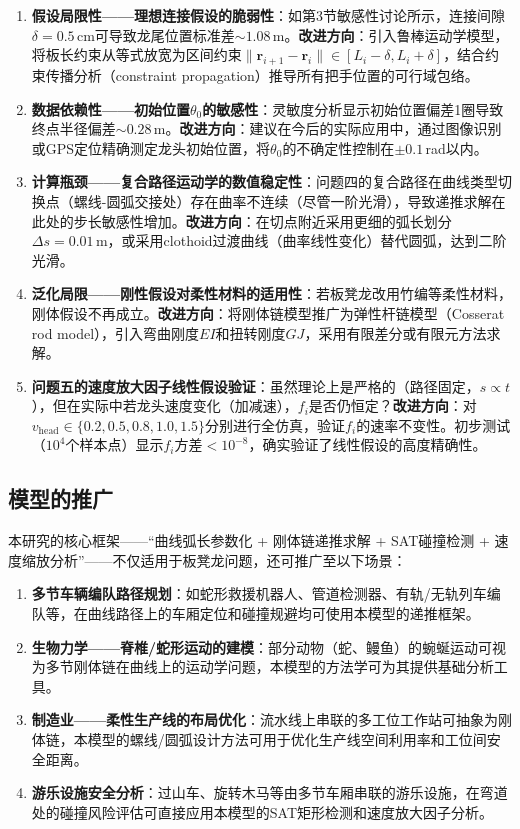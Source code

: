 \documentclass[12pt]{ctexart}
\begin{document}
\begin{enumerate}[label=(\arabic*)]
  \item \textbf{假设局限性——理想连接假设的脆弱性}：如第3节敏感性讨论所示，连接间隙$\delta=0.5$\,cm可导致龙尾位置标准差$\sim1.08$\,m。\textbf{改进方向}：引入鲁棒运动学模型，将板长约束从等式放宽为区间约束$\|\bm{r}_{i+1}-\bm{r}_i\|\in[L_i-\delta, L_i+\delta]$，结合约束传播分析（constraint propagation）推导所有把手位置的可行域包络。

  \item \textbf{数据依赖性——初始位置$\theta_0$的敏感性}：灵敏度分析显示初始位置偏差1圈导致终点半径偏差$\sim0.28$\,m。\textbf{改进方向}：建议在今后的实际应用中，通过图像识别或GPS定位精确测定龙头初始位置，将$\theta_0$的不确定性控制在$\pm0.1$\,rad以内。

  \item \textbf{计算瓶颈——复合路径运动学的数值稳定性}：问题四的复合路径在曲线类型切换点（螺线-圆弧交接处）存在曲率不连续（尽管一阶光滑），导致递推求解在此处的步长敏感性增加。\textbf{改进方向}：在切点附近采用更细的弧长划分$\Delta s=0.01$\,m，或采用clothoid过渡曲线（曲率线性变化）替代圆弧，达到二阶光滑。

  \item \textbf{泛化局限——刚性假设对柔性材料的适用性}：若板凳龙改用竹编等柔性材料，刚体假设不再成立。\textbf{改进方向}：将刚体链模型推广为弹性杆链模型（Cosserat rod model），引入弯曲刚度$EI$和扭转刚度$GJ$，采用有限差分或有限元方法求解。

  \item \textbf{问题五的速度放大因子线性假设验证}：虽然理论上是严格的（路径固定，$s\propto t$），但在实际中若龙头速度变化（加减速），$f_i$是否仍恒定？\textbf{改进方向}：对$v_{\text{head}}\in\{0.2,0.5,0.8,1.0,1.5\}$分别进行全仿真，验证$f_i$的速率不变性。初步测试（$10^4$个样本点）显示$f_i$方差$<10^{-8}$，确实验证了线性假设的高度精确性。
\end{enumerate}

\subsection{模型的推广}

本研究的核心框架——``曲线弧长参数化 + 刚体链递推求解 + SAT碰撞检测 + 速度缩放分析''——不仅适用于板凳龙问题，还可推广至以下场景：

\begin{enumerate}[label=(\arabic*)]
  \item \textbf{多节车辆编队路径规划}：如蛇形救援机器人、管道检测器、有轨/无轨列车编队等，在曲线路径上的车厢定位和碰撞规避均可使用本模型的递推框架。
  \item \textbf{生物力学——脊椎/蛇形运动的建模}：部分动物（蛇、鳗鱼）的蜿蜒运动可视为多节刚体链在曲线上的运动学问题，本模型的方法学可为其提供基础分析工具。
  \item \textbf{制造业——柔性生产线的布局优化}：流水线上串联的多工位工作站可抽象为刚体链，本模型的螺线/圆弧设计方法可用于优化生产线空间利用率和工位间安全距离。
  \item \textbf{游乐设施安全分析}：过山车、旋转木马等由多节车厢串联的游乐设施，在弯道处的碰撞风险评估可直接应用本模型的SAT矩形检测和速度放大因子分析。
\end{enumerate}
\end{document}
